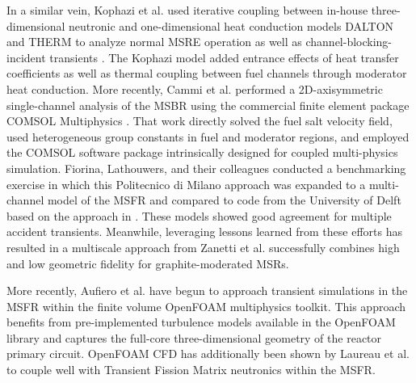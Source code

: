 \documentclass[answers,11pt]{exam}
\begin{document}
\begin{questions}
\begin{solution}
        In a similar vein, Kophazi et al. used iterative coupling between 
        in-house
        three-dimensional neutronic and one-dimensional heat conduction models 
        DALTON
        and THERM to analyze normal MSRE operation as well as
        channel-blocking-incident transients \cite{kophazi_development_2009}. 
        The
        Kophazi model added entrance effects of heat transfer coefficients as 
        well as
        thermal coupling between fuel channels through moderator heat 
        conduction. More
        recently, Cammi et al. performed a 2D-axisymmetric single-channel 
        analysis of
        the MSBR using the commercial finite element package COMSOL 
        Multiphysics
        \cite{cammi_multi-physics_2011}. That work directly solved the fuel 
        salt
        velocity field, used heterogeneous group constants in fuel and 
        moderator
        regions, and employed the COMSOL software package intrinsically 
        designed
        for coupled multi-physics simulation.  Fiorina, Lathouwers, and their
        colleagues conducted a benchmarking exercise 
        \cite{fiorina_modelling_2013} in
        which this Politecnico di Milano approach was expanded to a 
        multi-channel model 
        of the MSFR and compared to code from the University of Delft
        \cite{de_zwaan_static_2007,van_der_linden_2012} based on the approach 
        in
        \cite{kophazi_development_2009}. These models showed good agreement for
        multiple accident transients. Meanwhile, leveraging lessons learned 
        from these 
        efforts has resulted in a multiscale approach from Zanetti et al. 
        \cite{zanetti_geometric_2015} successfully combines high and low 
        geometric 
        fidelity for graphite-moderated MSRs.

        More recently, Aufiero et al. \cite{aufiero_development_2014} have 
        begun to
        approach transient simulations in the MSFR within the finite 
        volume
        OpenFOAM multiphysics toolkit\cite{weller_tensorial_1998}.  This 
        approach
        benefits from pre-implemented turbulence models available in the 
        OpenFOAM
        library and captures the full-core three-dimensional geometry of the 
        reactor
        primary circuit.  OpenFOAM CFD has additionally been shown by 
        Laureau et
        al. \cite{laureau_transient_2017} to couple well with Transient Fission 
        Matrix
        neutronics within the MSFR.
\end{solution}


\end{questions}
\end{document}
